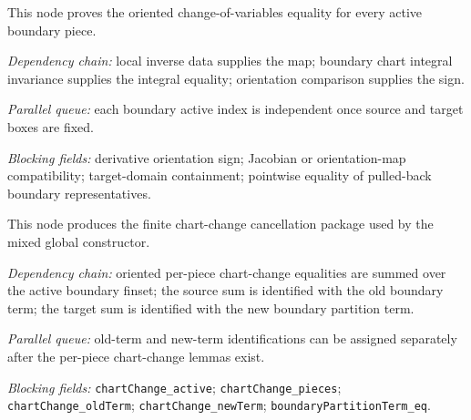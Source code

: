 \begin{lemma}
  \label{obl:m7_oriented_boundary_chart_change}
  This node proves the oriented change-of-variables equality for every active
  boundary piece.

  \emph{Dependency chain:}
  local inverse data supplies the map; boundary chart integral invariance
  supplies the integral equality; orientation comparison supplies the sign.

  \emph{Parallel queue:}
  each boundary active index is independent once source and target boxes are
  fixed.

  \emph{Blocking fields:}
  derivative orientation sign; Jacobian or orientation-map compatibility;
  target-domain containment; pointwise equality of pulled-back boundary
  representatives.
\end{lemma}

\begin{theorem}
  \label{obl:m7_boundary_chart_change_cancellation}
  This node produces the finite chart-change cancellation package used by the
  mixed global constructor.

  \emph{Dependency chain:}
  oriented per-piece chart-change equalities are summed over the active
  boundary finset; the source sum is identified with the old boundary term;
  the target sum is identified with the new boundary partition term.

  \emph{Parallel queue:}
  old-term and new-term identifications can be assigned separately after the
  per-piece chart-change lemmas exist.

  \emph{Blocking fields:}
  \texttt{chartChange\_active}; \texttt{chartChange\_pieces};
  \texttt{chartChange\_oldTerm}; \texttt{chartChange\_newTerm};
  \texttt{boundaryPartitionTerm\_eq}.
\end{theorem}

